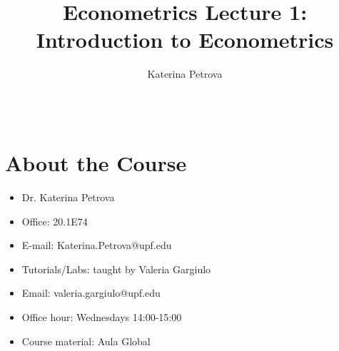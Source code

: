 \documentclass[notes=show]{beamer}
\begin{document}
\title{Econometrics Lecture 1: \\
Introduction to Econometrics}
\author{Katerina Petrova \ \ \ \ \ \ \ \ \ \ \ \ \ \ \ \ \ \ \ \ \ \ \ \ \ \
\ \ \ \ \ \ \ \ \ \ \ \ \ \ \ \ \ \ \ \ \ \ \ \ \ \ \ \ \ \ \ \ \ \ \ \ \ \
\ \ \ \ \ \ \ \ \ \ \ \ \ \ \ \ \ \ \ \ \ \ \ }
\date{}
\maketitle

\section{About the Course}

\begin{frame}%


\begin{itemize}
\item Dr. Katerina Petrova

\item Office: 20.1E74

\item E-mail: Katerina.Petrova@upf.edu

\item Tutorials/Labs: taught by Valeria Gargiulo

\item Email: valeria.gargiulo@upf.edu

\item Office hour: Wednesdays 14:00-15:00

\item Course material: Aula Global
\end{itemize}

\end{frame}%
\end{document}
